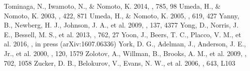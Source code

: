 \documentclass[iop]{emulateapj}
\begin{document}
\begin{thebibliography}{123456789}
 Tominaga, N., Iwamoto, N., \& Nomoto, K. 2014, \apj, 785, 98
 Umeda, H., \& Nomoto, K. 2003, \nat, 422, 871
 Umeda, H., \& Nomoto, K. 2005, \apj, 619, 427
 Yanny, B., Newberg, H. J., Johnson, J. A., et al. 2009, \aj, 137, 4377
 Yong, D., Norris, J. E., Bessell, M. S., et al. 2013, \apj, 762, 27
 Yoon, J., Beers, T. C., Placco, V. M., et al. 2016, \apj, in press (arXiv:1607.06336)
 York, D. G., Adelman, J., Anderson, J. E., Jr., et al. 2000, \aj, 120, 1579
 Zolotov, A., Willman, B., Brooks, A. M., et al. 2009, \apj, 702, 1058
 Zucker, D. B., Belokurov, V., Evans, N. W., et al. 2006, \apjl, 643, L103
\end{thebibliography}                                                                                                                                                
\clearpage
\end{document}
